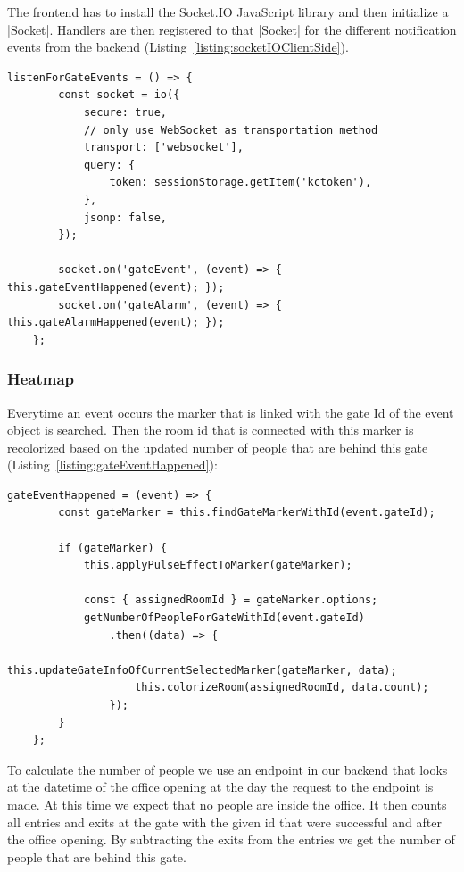 The frontend has to install the Socket.IO JavaScript library and then initialize a |Socket|\cite{socketio:socket}. Handlers are then registered to that |Socket| for the different notification events from the backend (Listing~\ref{listing:socketIOClientSide}).

\begin{lstlisting}[label={listing:socketIOClientSide},caption={Setup of Socket.IO socket}]
listenForGateEvents = () => {
        const socket = io({
            secure: true,
            // only use WebSocket as transportation method
            transport: ['websocket'],
            query: {
                token: sessionStorage.getItem('kctoken'),
            },
            jsonp: false,
        });

        socket.on('gateEvent', (event) => { this.gateEventHappened(event); });
        socket.on('gateAlarm', (event) => { this.gateAlarmHappened(event); });
    };
\end{lstlisting}


\subsubsection{Heatmap}

Everytime an event occurs the marker that is linked with the gate Id of the event object is searched. Then the room id that is connected with this marker is recolorized based on the updated number of people that are behind this gate (Listing~\ref{listing:gateEventHappened}):

\begin{lstlisting}[label={listing:gateEventHappened},caption={Handling gate events in frontend}]
gateEventHappened = (event) => {
        const gateMarker = this.findGateMarkerWithId(event.gateId);

        if (gateMarker) {
            this.applyPulseEffectToMarker(gateMarker);

            const { assignedRoomId } = gateMarker.options;
            getNumberOfPeopleForGateWithId(event.gateId)
                .then((data) => {
                    this.updateGateInfoOfCurrentSelectedMarker(gateMarker, data);
                    this.colorizeRoom(assignedRoomId, data.count);
                });
        }
    };
\end{lstlisting}

To calculate the number of people we use an endpoint in our backend that looks at the datetime of the office opening at the day the request to the endpoint is made. At this time we expect that no people are inside the office. It then counts all entries and exits at the gate with the given id that were successful and after the office opening. By subtracting the exits from the entries we get the number of people that are behind this gate.

